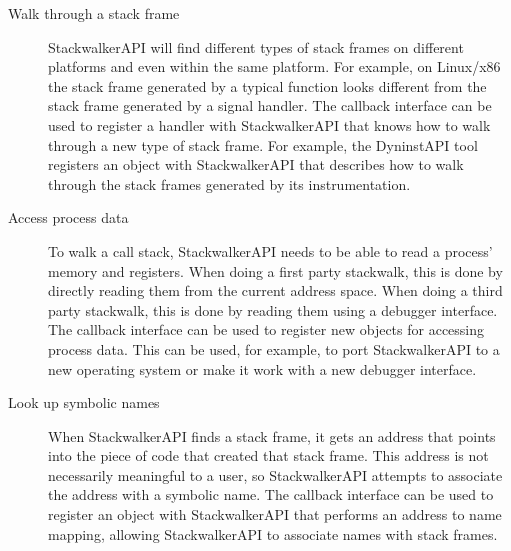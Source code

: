 \begin{description}
    \item[Walk through a stack frame] StackwalkerAPI will find different types
        of stack frames on different platforms and even within the same
        platform. For example, on Linux/x86 the stack frame generated by a
        typical function looks different from the stack frame generated by a
        signal handler. The callback interface can be used to register a handler
        with StackwalkerAPI that knows how to walk through a new type of stack
        frame. For example, the DyninstAPI tool registers an object with
        StackwalkerAPI that describes how to walk through the stack frames
        generated by its instrumentation.

    \item[Access process data] To walk a call stack, StackwalkerAPI needs to be
        able to read a process' memory and registers. When doing a first party
        stackwalk, this is done by directly reading them from the current
        address space. When doing a third party stackwalk, this is done by
        reading them using a debugger interface. The callback interface can be
        used to register new objects for accessing process data. This can be
        used, for example, to port StackwalkerAPI to a new operating system or
        make it work with a new debugger interface.

    \item[Look up symbolic names] When StackwalkerAPI finds a stack frame, it
        gets an address that points into the piece of code that created that
        stack frame. This address is not necessarily meaningful to a user, so
        StackwalkerAPI attempts to associate the address with a symbolic name.
        The callback interface can be used to register an object with
        StackwalkerAPI that performs an address to name mapping, allowing
        StackwalkerAPI to associate names with stack frames.
\end{description}
